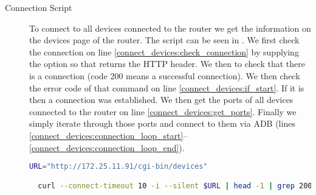\begin{description}
  \item[Connection Script] To connect to all devices connected to the router we get the information on the devices page of the router. The script can be seen in . We first check the connection on line \ref{connect_devices:check_connection} by supplying the  option so that  returns the HTTP header. We then  to check that there is a connection (code 200 means a successful connection). We then check the error code of that command on line \ref{connect_devices:if_start}. If it is  then a connection was established. We then get the ports of all devices connected to the router on line \ref{connect_devices:get_ports}. Finally we simply iterate through those ports and connect to them via ADB (lines \ref{connect_devices:connection_loop_start}--\ref{connect_devices:connection_loop_end}).

  \begin{lstlisting}[language=bash,caption=Script that connects to devices,label=lst:connect_devices]
  URL="http://172.25.11.91/cgi-bin/devices"

  curl --connect-timeout 10 -i --silent $URL | head -1 | grep 200 > /dev/null (*@\label{connect_devices:check_connection}@*)


\end{lstlisting}
\end{description}
